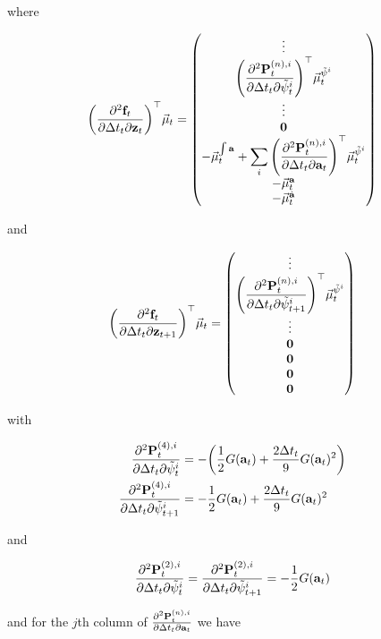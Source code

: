 \documentclass{article}
\newcommand{\isopsi}{\tilde \psi}
\begin{document}
where

\begin{equation}
  \qty(\pdv{\vb{f}_t}{\Delta t_t}{\vb{z}_t})^\top \vec \mu_t
  = \mqty(
    \vdots \\
    \qty(
      \displaystyle \pdv{\vb{P}^{(n),i}_t}{\Delta t_t}{\isopsi^i_t}
    )^\top \vec \mu^{\isopsi^i}_t \\ 
    \vdots \\
    \vb{0} \\
    -\vec \mu^{\int \vb{a}}_t 
    + \displaystyle \sum_i \qty(\pdv{\vb{P}^{(n),i}_t}{\Delta t_t}{\vb{a}_t})^\top \vec \mu^{\isopsi^i}_t \\
    -\vec \mu^{\vb{a}}_t\\ 
    -\vec \mu^{\dot{\vb{a}}}_t\\ 
  )
\end{equation}

and

\begin{equation}
  \qty(\pdv{\vb{f}_t}{\Delta t_t}{\vb{z}_{t+1}})^\top \vec \mu_t
  = \mqty(
    \vdots \\
    \qty(\displaystyle \pdv{\vb{P}^{(n),i}_t}{\Delta t_t}{\isopsi^i_{t+1}})^\top \vec \mu^{\isopsi^i}_t \\ 
    \vdots \\
    \vb{0} \\
    \vb{0} \\
    \vb{0} \\
    \vb{0} \\
  )
\end{equation}

with 

\begin{align}
  \pdv{\vb{P}^{(4),i}_t}{\Delta t_t}{\isopsi^i_t}
  &= -\qty(\frac{1}{2} G(\vb{a}_t) + \frac{2 \Delta t_t}{9} G(\vb{a}_t)^2) \\ 
  \pdv{\vb{P}^{(4),i}_t}{\Delta t_t}{\isopsi^i_{t+1}}
  &= -\frac{1}{2} G(\vb{a}_t) + \frac{2 \Delta t_t}{9} G(\vb{a}_t)^2 
\end{align}

and 

\begin{equation}
  \pdv{\vb{P}^{(2),i}_t}{\Delta t_t}{\isopsi^i_t}
  = \pdv{\vb{P}^{(2),i}_t}{\Delta t_t}{\isopsi^i_{t+1}}
  = -\frac{1}{2} G(\vb{a}_t) 
\end{equation}

and for the $j$th column of $\pdv{\vb{P}^{(n),i}_t}{\Delta t_t}{\vb{a}_t}$ we have
\end{document}

